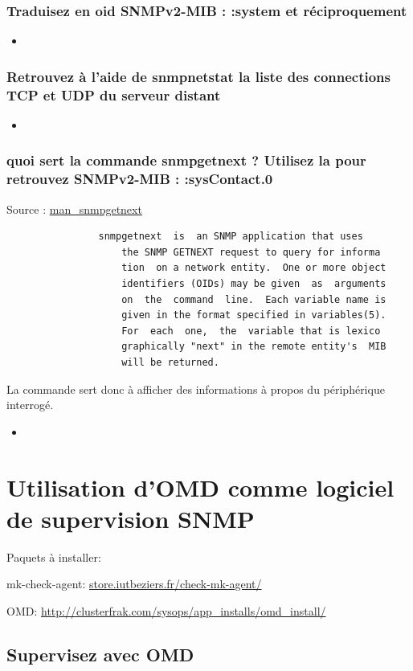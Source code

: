 \documentclass[10pt,a4paper]{article}
\newcommand{\insertcode}[2]{\begin{itemize}\item[]\end{itemize}}
\begin{document}
\subsubsection{Traduisez en oid SNMPv2-MIB : :system et réciproquement}
\insertcode{commande/7.txt}{Traduction}

\subsubsection{Retrouvez à l’aide de snmpnetstat la liste des connections TCP et UDP du serveur distant}
\insertcode{commande/8.txt}{snmpNetstat}


\subsubsection{ quoi sert la commande snmpgetnext ? Utilisez la pour retrouvez SNMPv2-MIB : :sysContact.0}
Source : \url{man_snmpgetnext}
\begin{lstlisting}
                snmpgetnext  is  an SNMP application that uses
                    the SNMP GETNEXT request to query for informa
                    tion  on a network entity.  One or more object
                    identifiers (OIDs) may be given  as  arguments
                    on  the  command  line.  Each variable name is
                    given in the format specified in variables(5).
                    For  each  one,  the  variable that is lexico
                    graphically "next" in the remote entity's  MIB
                    will be returned.

\end{lstlisting}
La commande sert donc à afficher des informations à propos du périphérique interrogé.
\insertcode{commande/9.txt}{snmpgetnext}
\newpage


 \section{Utilisation d’OMD comme logiciel de supervision SNMP}

Paquets à installer:

mk-check-agent: \url{store.iutbeziers.fr/check-mk-agent/}

OMD: \url{http://clusterfrak.com/sysops/app_installs/omd_install/}

\subsection{Supervisez avec OMD}
\end{document}
